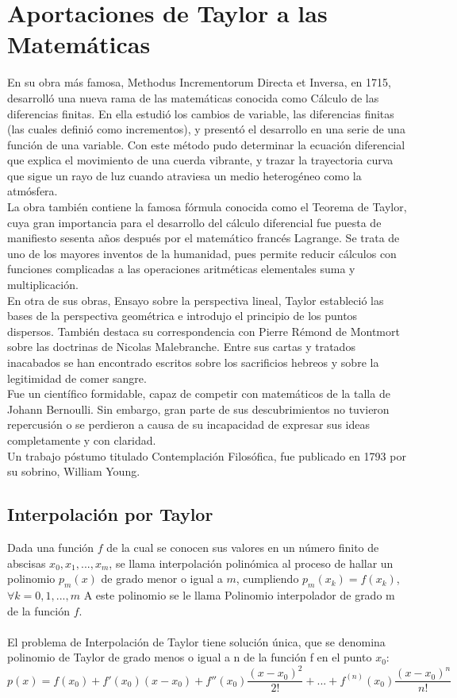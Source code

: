 \section{Aportaciones de Taylor a las Matem\'aticas}
\label{2:sec:2}
  En su obra m\'as famosa, Methodus Incrementorum Directa et Inversa, en 1715, desarroll\'o una nueva rama de las matem\'aticas conocida como C\'alculo de las diferencias finitas. En ella estudi\'o los cambios de variable, las diferencias finitas (las cuales defini\'o como incrementos), y present\'o el desarrollo en una serie de una funci\'on de una variable.
Con este m\'etodo pudo determinar la ecuaci\'on diferencial que explica el movimiento de una cuerda vibrante, y trazar la trayectoria curva que sigue un rayo de luz cuando atraviesa un medio heterog\'eneo como la atm\'osfera.\\
La obra tambi\'en contiene la famosa f\'ormula conocida como el Teorema de Taylor, cuya gran importancia para el desarrollo del c\'alculo diferencial fue puesta de manifiesto sesenta a\~nos despu\'es por el matem\'atico franc\'es Lagrange.
Se trata de uno de los mayores inventos de la humanidad, pues permite reducir c\'alculos con funciones complicadas a las operaciones aritm\'eticas elementales suma y multiplicaci\'on.\\
En otra de sus obras, Ensayo sobre la perspectiva lineal, Taylor estableci\'o las bases de la perspectiva geom\'etrica e introdujo el principio de los puntos dispersos.
También destaca su correspondencia con Pierre R\'emond de Montmort sobre las doctrinas de Nicolas Malebranche. Entre sus cartas y tratados inacabados se han encontrado escritos sobre los sacrificios hebreos y sobre la legitimidad de comer sangre.\\
Fue un cient\'ifico formidable, capaz de competir con matem\'aticos de la talla de Johann Bernoulli.
Sin embargo, gran parte de sus descubrimientos no tuvieron repercusi\'on o se perdieron a causa de su incapacidad de expresar sus ideas completamente y con claridad.\\

Un trabajo p\'ostumo titulado Contemplaci\'on Filos\'ofica, fue publicado en 1793 por su sobrino, William Young.
\subsection{Interpolaci\'on por Taylor}
Dada una funci\'on $f$ de la cual se conocen sus valores en un n\'umero finito de abscisas $x_{0}, x_{1}, ..., x_{m}$, se llama interpolaci\'on polin\'omica al proceso de hallar un polinomio $p_{m}(x)$ de grado menor o igual a $m$, cumpliendo $p_{m}(x_{k}) = f(x_{k})$, $\forall k = 0, 1, ..., m$
A este polinomio se le llama Polinomio interpolador de grado m de la funci\'on $f$.\\
\\
El problema de Interpolaci\'on de Taylor tiene soluci\'on \'unica, que se denomina polinomio de Taylor de grado menos o igual a n de la funci\'on f en el punto $x_{0}$:
$$p(x)=f(x_{0})+f'(x_{0})(x-x_{0})+f''(x_{0})\frac{(x-x_{0})^2}{2!}+...+f^{(n)}(x_{0})\frac{(x-x_{0})^n}{n!}$$
